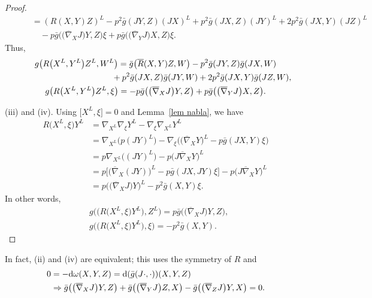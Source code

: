 \documentclass[pdftex]{sigma}
\numberwithin{equation}{section}
\theoremstyle{definition}
\newcommand{\bn}{\nabla}
\newcommand{\bbn}{\overline{\nabla}}
\newcommand{\bxi}{\xi}
\newcommand{\br}{ R}
\newcommand{\brr}{\overline R}
\newcommand{\bgg}{\bar g}
\newcommand{\bg}{ g}
\newcommand{\xl}{X^L}
\newcommand{\yl}{Y^L}
\newcommand{\zl}{Z^L}
\begin{document}
\begin{proof}
\begin{align*}
 &\qquad{}= (R(X, Y)Z)^L - p^2 \bgg(J Y, Z)(J X)^{L} + p^2 \bgg(J X, Z)(J Y)^{L} + 2 p^2 \bgg(JX, Y)(J Z)^{L} \nonumber\\
 &\qquad\quad{} - p \bgg\bigl(\bigl(\bbn_{X} J\bigr)Y, Z\bigr) \xi + p \bgg\bigl(\bigl(\bbn_{Y} J\bigr)X, Z\bigr) \xi. \nonumber
\end{align*}
Thus,
\begin{gather*}
g\bigl(R\bigl(X^{L}, Y^{L}\bigr)Z^{L}, W^{L}\bigr)
 = \bgg\bigl( \brr(X, Y) Z, W\bigr) - p^{2} \bgg(J Y, Z) \bgg(J X, W)\\
 \hphantom{g\bigl(R\bigl(X^{L}, Y^{L}\bigr)Z^{L}, W^{L}\bigr)=}{}
 + p^{2} \bgg(J X, Z) \bgg(J Y, W) + 2 p^{2} \bgg(J X, Y) \bgg(J Z, W),\\
\bg\bigl( R\bigl(X^{L}, Y^{L}\bigr)Z^{L}, \xi \bigr)
 = - p \bgg\bigl(\bigl(\bbn_{X} J\bigr) Y, Z\bigr) + p \bgg\bigl(\bigl(\bbn_{Y} J\bigr) X, Z\bigr).
\end{gather*}

(iii) and (iv). Using $\bigl[\xl,\bxi\bigr] = 0$ and Lemma~\ref{lem nabla}, we have
\begin{align*}
 \br\big(\xl,\bxi\big)\yl &= \bn_{\xl}\bn_{\bxi}\yl - \bn_{\bxi}\bn_{\xl}\yl\\
 & = \bn_{\xl}\bigl(p(JY)^L\bigr) - \bn_{\bxi}\bigl(\bigl(\overline{\nabla}_XY\bigr)^L - p\bgg(JX,Y)\bxi\bigr)\\
 &= p \bn_{\xl}\bigl((JY)^L\bigr)-p \bigl(J\bbn_XY\bigr)^L\\
 &= p\bigl[\bigl(\bbn_X(JY)\bigr)^L -p\bgg(JX,JY)\bxi\bigr]-p \bigl(J\bbn_XY\bigr)^L\\
 &= p\bigl(\bigl(\bbn_XJ\bigr)Y\bigr)^L - p^2 \bgg(X,Y)\bxi.
 \end{align*}
In other words,
\begin{align*}
 &\bg\bigl(\bigl( \br\bigl(\xl,\bxi\bigr)\yl),\zl\bigr)= p\bgg\bigl(\bigl(\bbn_XJ\bigr)Y, Z\bigr),\\
& \bg\bigl(\bigl( \br\bigl(\xl,\bxi\bigr)\yl\bigr),\bxi\bigr)= -p^2\bgg(X,Y).
\tag*{\qed}
\end{align*}\renewcommand{\qed}{}
 \end{proof}

 In fact, (ii) and (iv) are equivalent; this uses the symmetry of $\br$ and
 \begin{align*} 0 &= -{\rm d}\omega(X,Y,Z) = {\rm d}(\bgg(J\cdot,\cdot))(X,Y,Z)\\
 & \Rightarrow
 \bgg\bigl(\bigl(\bbn_X J\bigr) Y,Z\bigr) + \bgg\bigl(\bigl(\bbn_Y J\bigr)Z,X\bigr) - \bgg\bigl(\bigl(\bbn_Z J\bigr)Y,X\bigr) = 0.
 \end{align*}
\end{document}
